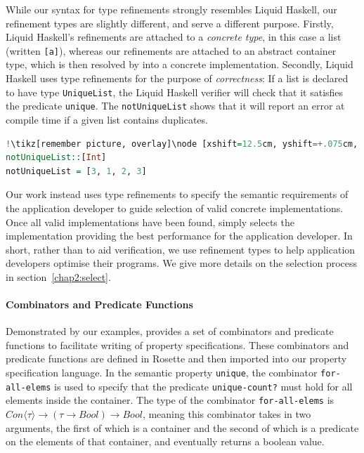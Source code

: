 \noindent While our syntax for type refinements strongly resembles Liquid Haskell, our refinement types are slightly different, and serve a different purpose.
Firstly, Liquid Haskell's refinements 
are attached to a \emph{concrete type}, in this case a list (written \lstinline{[a]}), whereas our refinements are attached to an abstract container type, which is then resolved by \Primrose{} into a concrete 
implementation. Secondly, Liquid Haskell 
uses type refinements for the purpose of \emph{correctness}: If a list is declared to have type \lstinline{UniqueList}, the Liquid Haskell verifier will check that it satisfies the predicate \lstinline{unique}. 
The \lstinline{notUniqueList} shows that it will report an error at compile time if a given list contains duplicates.
\begin{lstlisting}[language=haskell, style=boxedlst, escapechar=!]
!\tikz[remember picture, overlay]\node [xshift=12.5cm, yshift=+.075cm, inner sep=0.075cm, rectangle] {\footnotesize\bfseries\texttt{Liquid Haskell}};!{-@ notUniqueList :: UniqueList Int @-}
notUniqueList::[Int]
notUniqueList = [3, 1, 2, 3]
\end{lstlisting}
Our work instead uses type refinements to specify the semantic requirements of the application developer to guide selection of valid concrete implementations.
Once all valid implementations have been found, \Primrose{} simply selects the implementation providing the best performance for the application developer.
In short, rather than to aid verification, we use refinement types to help application developers optimise their programs. We give more details on the selection process in section~\ref{chap2:select}.

\paragraph*{Combinators and Predicate Functions} Demonstrated by our examples, \Primrose{} provides a set of combinators and predicate functions to facilitate writing of property specifications. 
These combinators and predicate functions are defined in Rosette and then imported into our property 
specification language.  In the semantic property \lstinline{unique}, the combinator \lstinline{for-all-elems} is used to specify that the predicate \lstinline{unique-count?} must hold for all elements inside the container. 
The type of the combinator \lstinline{for-all-elems} is $\mathit{Con}\langle\tau\rangle \to (\tau \to \mathit{Bool}) \to \mathit{Bool}$, meaning this combinator takes in two arguments, the first of which is a container and the second of which is a predicate on the elements of that container, and eventually returns a boolean value.

